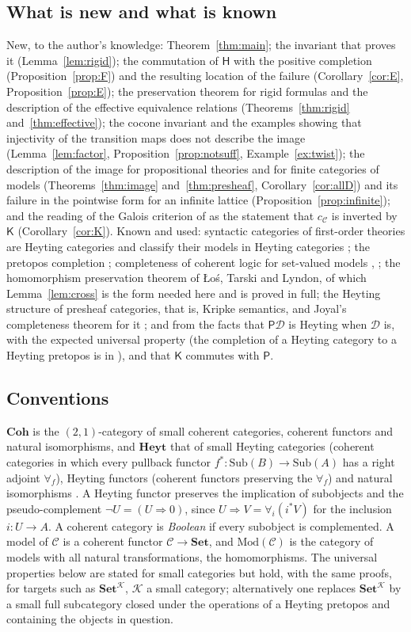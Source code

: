 \documentclass[11pt]{amsart}
\theoremstyle{definition}
\newcommand{\Coh}{\mathbf{Coh}}
\newcommand{\Heyt}{\mathbf{Heyt}}
\newcommand{\Mod}{\mathrm{Mod}}
\newcommand{\Set}{\mathbf{Set}}
\newcommand{\Sub}{\mathrm{Sub}}
\newcommand{\PP}{\mathsf P}
\newcommand{\HH}{\mathsf H}
\newcommand{\KK}{\mathsf K}
\newcommand{\cC}{\mathcal C}
\newcommand{\cD}{\mathcal D}
\newcommand{\cK}{\mathcal K}
\begin{document}
\subsection*{What is new and what is known}
New, to the author's knowledge: Theorem~\ref{thm:main}; the invariant
that proves it (Lemma~\ref{lem:rigid}); the commutation of $\HH$ with
the positive completion (Proposition~\ref{prop:F}) and the resulting
location of the failure (Corollary~\ref{cor:E},
Proposition~\ref{prop:E}); the preservation theorem for rigid formulas
and the description of the effective equivalence relations
(Theorems~\ref{thm:rigid} and~\ref{thm:effective}); the cocone
invariant and the examples showing that injectivity of the transition
maps does not describe the image (Lemma~\ref{lem:factor},
Proposition~\ref{prop:notsuff}, Example~\ref{ex:twist}); the
description of the image for propositional theories and for finite
categories of models (Theorems~\ref{thm:image}
and~\ref{thm:presheaf}, Corollary~\ref{cor:allD}) and its failure in
the pointwise form for an infinite lattice
(Proposition~\ref{prop:infinite}); and the reading of the
Galois criterion of \cite{Morley} as the statement that $c_\cC$ is
inverted by $\KK$ (Corollary~\ref{cor:K}). Known and used: syntactic
categories of first-order theories are Heyting categories and classify
their models in Heyting categories \cite[D1.4]{Elephant}; the pretopos
completion \cite[A3.3]{Elephant}; completeness of coherent logic for
set-valued models \cite[D1.5]{Elephant}, \cite{MR77}; the homomorphism
preservation theorem of \L o\'s, Tarski and Lyndon, of which
Lemma~\ref{lem:cross} is the form needed here and is proved in full;
the Heyting structure of presheaf categories, that is, Kripke
semantics, and Joyal's completeness theorem for it \cite{MR95}; and from \cite{Morley} the facts that $\PP\cD$ is Heyting
when $\cD$ is, with the expected universal property (the completion
of a Heyting category to a Heyting pretopos is in \cite[\S1]{Pitts89}),
and that $\KK$ commutes with $\PP$.

\subsection*{Conventions}
$\Coh$ is the $(2,1)$-category of small coherent categories, coherent
functors and natural isomorphisms, and $\Heyt$ that of small Heyting
categories (coherent categories in which every pullback functor
$f^*\colon\Sub(B)\to\Sub(A)$ has a right adjoint $\forall_f$), Heyting
functors (coherent functors preserving the $\forall_f$) and natural
isomorphisms \cite[A1.4]{Elephant}. A Heyting functor preserves the
implication of subobjects and the pseudo-complement $\neg U=(U
\Rightarrow0)$, since $U\Rightarrow V=\forall_i(i^*V)$ for the
inclusion $i\colon U\to A$. A coherent category is \emph{Boolean} if
every subobject is complemented. A model of $\cC$ is a coherent functor
$\cC\to\Set$, and $\Mod(\cC)$ is the category of models with all
natural transformations, the homomorphisms. The universal properties
below are stated for small categories but hold, with the same proofs,
for targets such as $\Set^{\cK}$, $\cK$ a small category; alternatively
one replaces $\Set^{\cK}$ by a small full subcategory closed under the
operations of a Heyting pretopos and containing the objects in
question.
\end{document}
